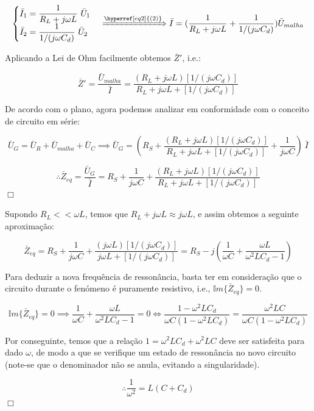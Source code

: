 $$
    \begin{cases}
        \bar{I}_1 = \dfrac{1}{R_L + j\omega L}\ \bar{U}_1\\
        \bar{I}_2 = \dfrac{1}{1/(j\omega C_d)}\ \bar{U}_2
    \end{cases}
    \xRightarrow[]{\hyperref[eq2]{(2)}}
    \bar{I} = (\frac{1}{R_L + j\omega L} + \frac{1}{1/(j\omega C_d)})\bar{U}_{malha} 
$$

Aplicando a Lei de Ohm facilmente obtemos $\bar{Z}'$, i.e.:

$$
    \bar{Z}' = \frac{\bar{U}_{malha}}{\bar{I}} = \frac{(R_L + j\omega L)[1/(j\omega C_d)]}{R_L + j\omega L + [1/(j\omega C_d)]}
$$

De acordo com o plano, agora podemos analizar em conformidade com o conceito de circuito em série:

$$
\bar{U}_G = \bar{U}_R + \bar{U}_{malha} + \bar{U}_C \implies \bar{U}_G = (R_S + \frac{(R_L + j\omega L)[1/(j\omega C_d)]}{R_L + j\omega L + [1/(j\omega C_d)]} + \frac{1}{j\omega C})\ \bar{I}
$$

$$
\therefore \bar{Z}_{eq} = \frac{\bar{U}_G}{\bar{I}} = R_S + \frac{1}{j\omega C} + \frac{(R_L + j\omega L)[1/(j\omega C_d)]}{R_L + j\omega L + [1/(j\omega C_d)]}
$$
\hfill \ensuremath{\Box}

Supondo $R_L << \omega L$, temos que $R_L + j\omega L \approx j\omega L$, e assim obtemos a seguinte aproximação:

$$
\bar{Z}_{eq} = R_S + \frac{1}{j\omega C} + \frac{(j\omega L)[1/(j\omega C_d)]}{j\omega L + [1/(j\omega C_d)]} = R_S - j(\frac{1}{\omega C} + \frac{\omega L}{\omega^2 L C_d - 1})
$$

Para deduzir a nova frequência de ressonância, basta ter em consideração que o circuito durante o fenómeno é puramente resistivo, i.e., $\mathbb{I}m\{\bar{Z}_{eq}\} = 0$.

$$
\mathbb{I}m\{\bar{Z}_{eq}\} = 0
\implies
\frac{1}{\omega C} + \frac{\omega L}{\omega^2 L C_d - 1} = 0
\iff
\frac{1-\omega^2 L C_d}{\omega C(1-\omega^2 L C_d)} = \frac{\omega^2 L C}{\omega C(1-\omega^2 L C_d)}
$$

Por conseguinte, temos que a relação $1 = \omega^2 L C_d + \omega^2 L C$ deve ser satisfeita para dado $\omega$, de modo a que se verifique um estado de ressonância no novo circuito (note-se que o denominador não se anula, evitando a singularidade).

$$
    \therefore \frac{1}{\omega^2} = L(C + C_d)
$$
\hfill \ensuremath{\Box}
